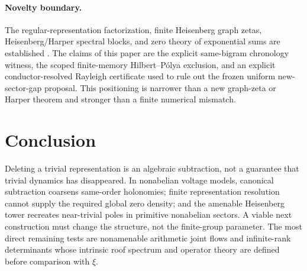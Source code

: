\paragraph{Novelty boundary.}
The regular-representation factorization, finite Heisenberg graph zetas,
Heisenberg/Harper spectral blocks, and zero theory of exponential sums are
established \citep{sato2006weighted,dedeo2003spectra,dedeo2005heisenberg,
beguin1997harper,langer1931zeros}. The claims of this paper are the explicit
same-bigram chronology witness, the scoped finite-memory Hilbert--Pólya
exclusion, and an explicit conductor-resolved Rayleigh certificate used to
rule out the frozen uniform new-sector-gap proposal. This positioning is
narrower than a new graph-zeta or Harper theorem and stronger than a finite
numerical mismatch.

\section{Conclusion}
\label{sec:conclusion}

Deleting a trivial representation is an algebraic subtraction, not a
guarantee that trivial dynamics has disappeared. In nonabelian voltage
models, canonical subtraction coarsens same-order holonomies; finite
representation resolution cannot supply the required global zero density;
and the amenable Heisenberg tower recreates near-trivial poles in primitive
nonabelian sectors. A viable next construction must change the structure,
not the finite-group parameter. The most direct remaining tests are
nonamenable arithmetic joint flows and infinite-rank determinants whose
intrinsic roof spectrum and operator theory are defined before comparison
with \(\xi\).
